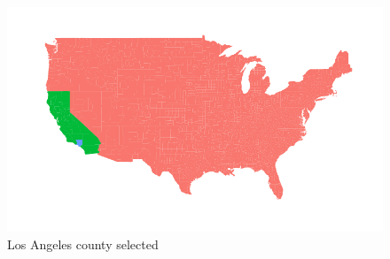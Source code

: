 \documentclass{article}\usepackage[]{graphicx}\usepackage[]{color}
\makeatletter
\def\maxwidth{ %
  \ifdim\Gin@nat@width>\linewidth
    \linewidth
  \else
    \Gin@nat@width
  \fi
}
\newenvironment{knitrout}{}{} %
\makeatother
\begin{document}
\begin{knitrout}
\color{fgcolor}\begin{figure}[]


{\centering \includegraphics[width=\maxwidth]{figure/county} 

}

\caption[Los Angeles county selected]{Los Angeles county selected\label{fig:county}}
\end{figure}


\end{knitrout}
\end{document}
